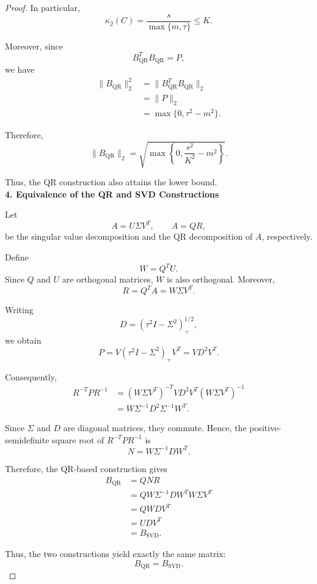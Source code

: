 \documentclass[11pt, reqno, a4paper]{amsart}
\theoremstyle{plain}
\theoremstyle{definition}
\theoremstyle{remark}
\numberwithin{equation}{section}
\begin{document}
\begin{proof}
In particular,
\[
\kappa_2(C)
=
\frac{s}{\max\{m,\tau\}}
\leq K.
\]

Moreover, since
\[
B_{\mathrm{QR}}^TB_{\mathrm{QR}}=P,
\]
we have
\begin{align*}
\|B_{\mathrm{QR}}\|_2^2
&=\|B_{\mathrm{QR}}^TB_{\mathrm{QR}}\|_2\\
&=\|P\|_2\\
&=\max\{0,\tau^2-m^2\}.
\end{align*}

Therefore,
\[
\boxed{
\|B_{\mathrm{QR}}\|_2
=
\sqrt{
\max\left\{
0,\frac{s^2}{K^2}-m^2
\right\}
}.
}
\]

Thus, the QR construction also attains the lower bound. \\


\textbf{4. Equivalence of the QR and SVD Constructions}

Let
\[
A=U\Sigma V^T,\qquad A=QR,
\]
be the singular value decomposition and the QR decomposition of \(A\), respectively.

Define
\[
W=Q^TU.
\]
Since \(Q\) and \(U\) are orthogonal matrices, \(W\) is also orthogonal. Moreover,
\[
R=Q^TA=W\Sigma V^T.
\]

Writing
\[
D=(\tau^2I-\Sigma^2)_+^{1/2},
\]
we obtain
\[
P=V(\tau^2I-\Sigma^2)_+V^T=VD^2V^T.
\]

Consequently,
\[
\begin{aligned}
R^{-T}PR^{-1}
&=(W\Sigma V^T)^{-T}
VD^2V^T
(W\Sigma V^T)^{-1}\\
&=W\Sigma^{-1}D^2\Sigma^{-1}W^T.
\end{aligned}
\]

Since \(\Sigma\) and \(D\) are diagonal matrices, they commute. Hence, the positive-semidefinite square root of \(R^{-T}PR^{-1}\) is
\[
N=W\Sigma^{-1}DW^T.
\]

Therefore, the QR-based construction gives
\[
\begin{aligned}
B_{\mathrm{QR}}
&=QNR\\
&=QW\Sigma^{-1}DW^TW\Sigma V^T\\
&=QWDV^T\\
&=UDV^T\\
&=B_{\mathrm{SVD}}.
\end{aligned}
\]

Thus, the two constructions yield exactly the same matrix:
\[
\boxed{B_{\mathrm{QR}}=B_{\mathrm{SVD}}.}
\]


\medskip

\noindent

\end{proof}



\end{document}
